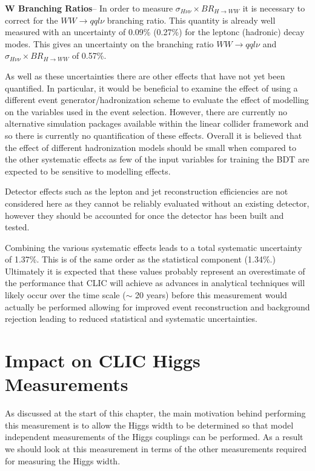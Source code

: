 \textbf{W Branching Ratios}-- In order to measure $\sigma_{H\nu\nu}\times BR_{H\rightarrow WW}$ it is necessary to correct for the $WW\rightarrow qql\nu$ branching ratio. This quantity is already well measured\cite{Patrignani:2016xqp} with an uncertainty of 0.09\% (0.27\%) for the leptonc (hadronic) decay modes. This gives an uncertainty on the branching ratio $WW\rightarrow qql\nu$ and $\sigma_{H\nu\nu}\times BR_{H\rightarrow WW}$ of 0.57\%.

As well as these uncertainties there are other effects that have not yet been quantified. In particular, it would be beneficial to examine the effect of using a different event generator/hadronization scheme to evaluate the effect of modelling on the variables used in the event selection. However, there are currently no alternative simulation packages available within the linear collider framework and so there is currently no quantification of these effects. Overall it is believed that the effect of different hadronization models should be small when compared to the other systematic effects as few of the input variables for training the BDT are expected to be sensitive to modelling effects.

Detector effects such as the lepton and jet reconstruction efficiencies are not considered here as they cannot be reliably evaluated without an existing detector, however they should be accounted for once the detector has been built and tested.

Combining the various systematic effects leads to a total systematic uncertainty of 1.37\%. This is of the same order as the statistical component (1.34\%.) Ultimately it is expected that these values probably represent an overestimate of the performance that \ac{CLIC} will achieve as advances in analytical techniques will likely occur over the time scale ($\sim$ 20 years) before this measurement would actually be performed allowing for improved event reconstruction and background rejection leading to reduced statistical and systematic uncertainties.  

\section{Impact on CLIC Higgs Measurements}
As discussed at the start of this chapter, the main motivation behind performing this measurement is to allow the Higgs width to be determined so that model independent measurements of the Higgs couplings can be performed. As a result we should look at this measurement in terms of the other measurements required for measuring the Higgs width.


